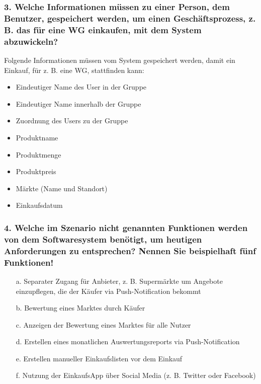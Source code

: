 \documentclass[12pt,a4paper]{article}
\begin{document}
\subsubsection*{3. Welche Informationen müssen zu einer Person, dem Benutzer, gespeichert werden, um einen Geschäftsprozess, z. B. das für eine WG einkaufen, mit dem System abzuwickeln?}
Folgende Informationen müssen vom System gespeichert werden, damit ein Einkauf, für z. B. eine WG, stattfinden kann:
\begin{itemize} 
\item Eindeutiger Name des User in der Gruppe %
\item Eindeutiger Name innerhalb der Gruppe %
\item Zuordnung des Users zu der Gruppe %
\item Produktname
\item Produktmenge
\item Produktpreis
\item Märkte (Name und Standort)
\item Einkaufsdatum
\end{itemize}
\subsubsection*{4. Welche im Szenario nicht genannten Funktionen werden von dem Softwaresystem benötigt, um heutigen Anforderungen zu entsprechen? Nennen Sie beispielhaft fünf Funktionen!}
\begin{itemize}
\item[a.] Separater Zugang für Anbieter, z. B. Supermärkte um Angebote einzupflegen, die der Käufer via Push-Notification bekommt
\item[b.] Bewertung eines Marktes durch Käufer
\item[c.] Anzeigen der Bewertung eines Marktes für alle Nutzer
\item[d.] Erstellen eines monatlichen Auswertungsreports via Push-Notification 
\item[e.] Erstellen manueller Einkaufslisten vor dem Einkauf 
\item[f.] Nutzung der EinkaufsApp über Social Media (z. B. Twitter oder Facebook)
\end{itemize} 
\newpage
\end{document}
